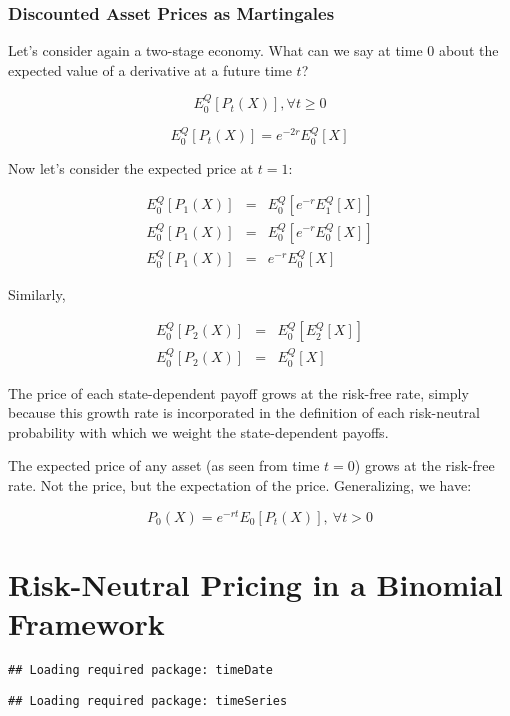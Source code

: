 \documentclass[justified]{tufte-book}
\begin{document}
\hypertarget{discounted-asset-prices-as-martingales}{%
\subsection{Discounted Asset Prices as Martingales}\label{discounted-asset-prices-as-martingales}}

Let's consider again a two-stage economy. What can we say at time 0
about the expected value of a derivative at a future time \(t\)?

\[E_0^Q[P_t(X)], \forall t \geq 0\]

\[E_0^Q[P_t(X)] = e^{-2r}E_0^Q[X]\]

Now let's consider the expected price at \(t=1\):

\[\begin{aligned}
E_0^Q[P_1(X)] & = & E_0^Q[e^{-r}E_1^Q[X]] \\
E_0^Q[P_1(X)] & = & E_0^Q[e^{-r}E_0^Q[X]] \\
E_0^Q[P_1(X)] & = & e^{-r} E_0^Q[X]\end{aligned}\]

Similarly,

\[\begin{aligned}
E_0^Q[P_2(X)] & = & E_0^Q[E_2^Q[X]] \\
E_0^Q[P_2(X)] & = & E_0^Q[X]\end{aligned}\]

The price of each state-dependent payoff grows at the risk-free rate,
simply because this growth rate is incorporated in the definition of
each risk-neutral probability with which we weight the state-dependent
payoffs.

The expected price of any asset (as seen from time \(t=0\)) grows at the
risk-free rate. Not the price, but the expectation of the price.
Generalizing, we have:

\[P_0(X) = e^{-rt}E_0[P_t(X)], \ \forall t>0\]

\hypertarget{binomial}{%
\chapter{Risk-Neutral Pricing in a Binomial Framework}\label{binomial}}

\begin{verbatim}
## Loading required package: timeDate
\end{verbatim}

\begin{verbatim}
## Loading required package: timeSeries
\end{verbatim}
\end{document}
